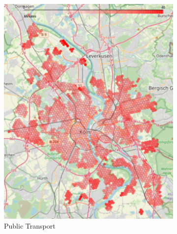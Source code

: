 \begin{figure}
     \centering
     \begin{subfigure}[b]{0.3\textwidth}
         \centering
         \includegraphics[width=\textwidth]{Figures/results/minute_city_metric/public_transport_optimal_map}
         \caption{Public Transport}
         \label{fig:public_transport_optimal_map}
     \end{subfigure}
     \hfill
     \begin{subfigure}[b]{0.3\textwidth}
         \centering

\end{subfigure}
\end{figure}
